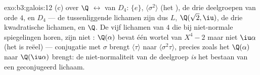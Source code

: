 \begin{solution}{exo:b3:galois:12}
(c)  over $\Q$ $\leftrightarrow$  van $D_4$:
$\{e\}$, $\langle\sigma^2\rangle$ (het ), de drie
deelgroepen van orde $4$, en $D_4$ --- de  tussenliggende
lichamen zijn dus $L$, $\Q(\sqrt2, \iu)$, de drie kwadratische
lichamen, en $\Q$. De vijf lichamen van  $4$ die bij
niet-normale spiegelingen horen, zijn niet : $\Q(\alpha)$
bevat één wortel van $X^4 - 2$ maar niet $\iu\alpha$ (het is
reëel) --- conjugatie met $\sigma$ brengt $\langle\tau\rangle$
naar $\langle\sigma^2\tau\rangle$, precies zoals het $\Q(\alpha)$
naar $\Q(\iu\alpha)$ brengt: de niet-normaliteit van de deelgroep
\emph{is} het bestaan van een geconjugeerd lichaam.
\end{solution}

